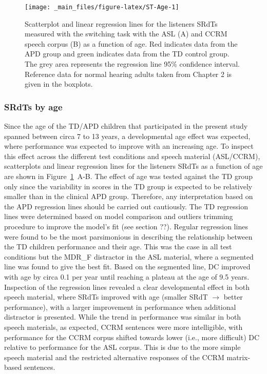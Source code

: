 \documentclass[a4paper, twoside]{templates/ociamthesis}
\begin{document}
\begin{figure}[h]

{\centering \texttt{[image: \_main\_files/figure-latex/ST-Age-1]} 

}

\caption{Scatterplot and linear regression lines for the listeners SRdTs measured with the switching task with the ASL (A) and CCRM speech corpus (B) as a function of age. Red indicates data from the APD group and green indicates data from the TD control group. The grey area represents the regression line 95\% confidence interval. Reference data for normal hearing adults taken from Chapter 2 is given in the boxplots.}\label{fig:ST-Age}
\end{figure}

\hypertarget{srdts-by-age}{%
\subsubsection*{SRdTs by age}\label{srdts-by-age}}

Since the age of the TD/APD children that participated in the present study spanned between circa 7 to 13 years, a developmental age effect was expected, where performance was expected to improve with an increasing age. To inspect this effect across the different test conditions and speech material (ASL/CCRM), scatterplots and linear regression lines for the listeners SRdTs as a function of age are shown in Figure~\ref{fig:ST-Age}~A-B. The effect of age was tested against the TD group only since the variability in scores in the TD group is expected to be relatively smaller than in the clinical APD group. Therefore, any interpretation based on the APD regression lines should be carried out cautiously. The TD regression lines were determined based on model comparison and outliers trimming procedure to improve the model's fit (see section ??). Regular regression lines were found to be the most parsimonious in describing the relationship between the TD children performance and their age. This was the case in all test conditions but the MDR\_F distractor in the ASL material, where a segmented line was found to give the best fit. Based on the segmented line, DC improved with age by circa 0.1 per year until reaching a plateau at the age of 9.5 years. Inspection of the regression lines revealed a clear developmental effect in both speech material, where SRdTs improved with age (smaller SRdT \(\rightarrow\) better performance), with a larger improvement in performance when additional distractor is presented. While the trend in performance was similar in both speech materials, as expected, CCRM sentences were more intelligible, with performance for the CCRM corpus shifted towards lower (i.e., more difficult) DC relative to performance for the ASL corpus. This is due to the more simple speech material and the restricted alternative responses of the CCRM matrix-based sentences.
\end{document}

